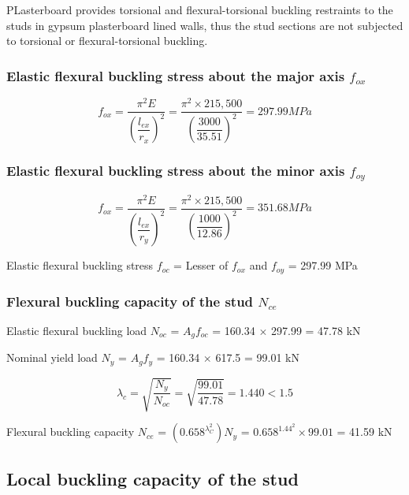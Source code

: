 PLasterboard provides torsional and flexural-torsional buckling restraints to the studs in gypsum plasterboard lined walls, thus the stud sections are not subjected to torsional or flexural-torsional buckling.

\subsubsection*{Elastic flexural buckling stress about the major axis $f_{ox}$}

\begin{equation*}
    f_{ox} = \dfrac{\pi^2E}{\left(\dfrac{l_{ex}}{r_x}\right)^2} = \dfrac{\pi^2 \times 215,500}{\left(\dfrac{3000}{35.51}\right)^2} = 297.99MPa
\end{equation*}

\subsubsection*{Elastic flexural buckling stress about the minor axis $f_{oy}$}

\begin{equation*}
    f_{ox} = \dfrac{\pi^2E}{\left(\dfrac{l_{ex}}{r_y}\right)^2} = \dfrac{\pi^2 \times 215,500}{\left(\dfrac{1000}{12.86}\right)^2} = 351.68 MPa
\end{equation*}

Elastic flexural buckling stress $f_{oc}$ = Lesser of $f_{ox}$ and $f_{oy}$ = 297.99 MPa

\subsubsection*{Flexural buckling capacity of the stud $N_{ce}$}

Elastic flexural buckling load $N_{oc}$ = $A_g$$f_{oc}$ = 160.34 $\times$ 297.99 = 47.78 kN

Nominal yield load $N_y$ = $A_g$$f_y$ = 160.34 $\times$ 617.5 = 99.01 kN

\begin{equation*}
    \lambda_c = \sqrt{\dfrac{N_y}{N_{oc}}} = \sqrt{\dfrac{99.01}{47.78}} = 1.440<1.5
\end{equation*}

Flexural buckling capacity $N_{ce}$ = $(0.658^{\lambda_C^2})N_y$ = $0.658^{{1.44}^{2}} \times 99.01$ = 41.59 kN

\subsection*{Local buckling capacity of the stud}

